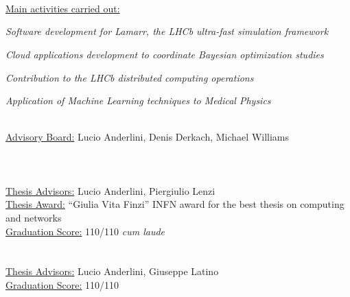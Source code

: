 \begin{cvcontent}
  \\ [0.5mm]
  \\ [1.5mm]
  \\ [1.5mm]
  {\normalsize \color{maincolor} \ul{Main activities carried out:}\\ [1.5mm]
  \begin{itemize*}[label=\textcolor{iconcolor}{\textbullet}]
    \item \emph{Software development for Lamarr, the LHCb ultra-fast simulation framework}\\ [0.5mm]
    \item \emph{Cloud applications development to coordinate Bayesian optimization studies}\\ [0.5mm]
    \item \emph{Contribution to the LHCb distributed computing operations}\\ [0.5mm]
    \item \emph{Application of Machine Learning techniques to Medical Physics}
  \end{itemize*}}\\ [1.5mm]
  \ul{Advisory Board:} Lucio Anderlini, Denis Derkach, Michael Williams 
  \\ [5mm]
  \\ [0.5mm]
  \\ [1.5mm]
  \\ [1.5mm]
  \ul{Thesis Advisors:} Lucio Anderlini, Piergiulio Lenzi\\ [1.5mm]
  \ul{Thesis Award:} ``Giulia Vita Finzi'' INFN award for the best thesis on computing and networks\\ [1.5mm]
  \ul{Graduation Score:} 110/110 \emph{cum laude}
  \newpage\noindent
  \\ [0.5mm]
  \\ [1.5mm]
  \\ [1.5mm]
  \ul{Thesis Advisors:} Lucio Anderlini, Giuseppe Latino\\ [1.5mm]
  \ul{Graduation Score:} 110/110
\end{cvcontent}